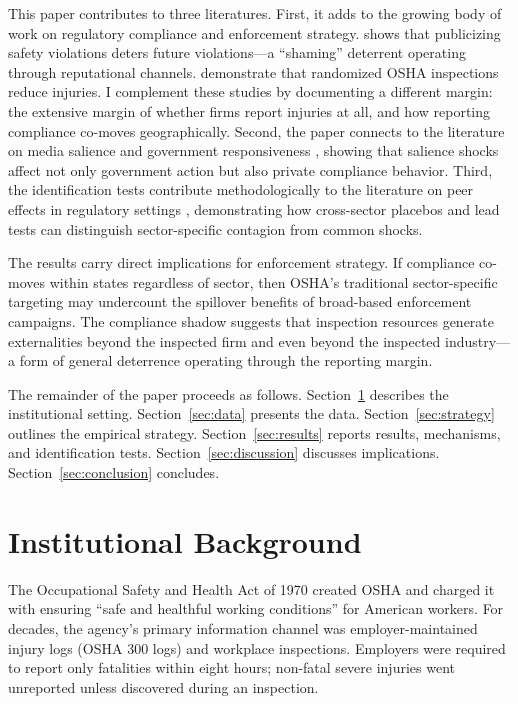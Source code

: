 \documentclass[12pt]{article}
\begin{document}
This paper contributes to three literatures. First, it adds to the growing body of work on regulatory compliance and enforcement strategy. \citet{johnson2020osha} shows that publicizing safety violations deters future violations---a ``shaming'' deterrent operating through reputational channels. \citet{levine2012randomized} demonstrate that randomized OSHA inspections reduce injuries. I complement these studies by documenting a different margin: the extensive margin of whether firms report injuries at all, and how reporting compliance co-moves geographically. Second, the paper connects to the literature on media salience and government responsiveness \citep{eisensee2007news, dellavigna2009persuasion}, showing that salience shocks affect not only government action but also private compliance behavior. Third, the identification tests contribute methodologically to the literature on peer effects in regulatory settings \citep{manski1993identification}, demonstrating how cross-sector placebos and lead tests can distinguish sector-specific contagion from common shocks.

The results carry direct implications for enforcement strategy. If compliance co-moves within states regardless of sector, then OSHA's traditional sector-specific targeting may undercount the spillover benefits of broad-based enforcement campaigns. The compliance shadow suggests that inspection resources generate externalities beyond the inspected firm and even beyond the inspected industry---a form of general deterrence \citep{thornton2005general} operating through the reporting margin.

The remainder of the paper proceeds as follows. Section~\ref{sec:background} describes the institutional setting. Section~\ref{sec:data} presents the data. Section~\ref{sec:strategy} outlines the empirical strategy. Section~\ref{sec:results} reports results, mechanisms, and identification tests. Section~\ref{sec:discussion} discusses implications. Section~\ref{sec:conclusion} concludes.


\section{Institutional Background}
\label{sec:background}

The Occupational Safety and Health Act of 1970 created OSHA and charged it with ensuring ``safe and healthful working conditions'' for American workers. For decades, the agency's primary information channel was employer-maintained injury logs (OSHA 300 logs) and workplace inspections. Employers were required to report only fatalities within eight hours; non-fatal severe injuries went unreported unless discovered during an inspection.
\end{document}
